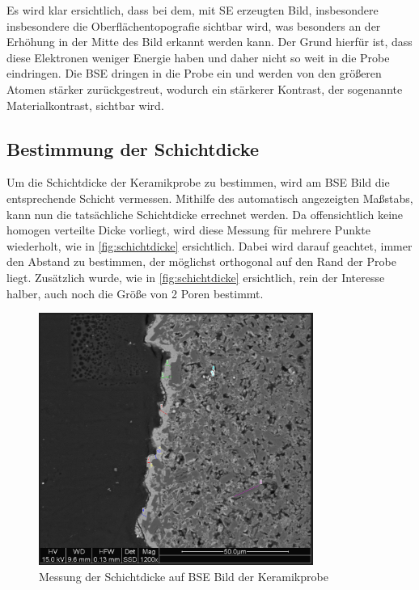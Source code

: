 \documentclass[12pt,english,ngerman]{scrartcl}
\begin{document}
Es wird klar ersichtlich, dass bei dem, mit SE erzeugten Bild, insbesondere insbesondere die Oberflächentopografie sichtbar
wird, was besonders an der Erhöhung in der Mitte des Bild erkannt werden kann. Der Grund hierfür ist, dass diese Elektronen
weniger Energie haben und daher nicht so weit in die Probe eindringen. Die BSE dringen in die Probe ein und werden von den 
größeren Atomen stärker zurückgestreut, wodurch ein stärkerer Kontrast, der sogenannte Materialkontrast, sichtbar wird.


\subsection{Bestimmung der Schichtdicke}

Um die Schichtdicke der Keramikprobe zu bestimmen, wird am BSE Bild die entsprechende Schicht vermessen. Mithilfe des automatisch
angezeigten Maßstabs, kann nun die tatsächliche Schichtdicke errechnet werden. Da offensichtlich keine homogen verteilte
Dicke vorliegt, wird diese Messung für mehrere Punkte wiederholt, wie in \autoref{fig:schichtdicke} ersichtlich. Dabei wird 
darauf geachtet, immer den Abstand zu bestimmen, der möglichst orthogonal auf den Rand der Probe liegt. Zusätzlich wurde,
wie in \autoref{fig:schichtdicke} ersichtlich, rein der Interesse halber, auch noch die Größe von 2 Poren bestimmt.

\begin{figure}[H]
	\begin{center}
		\includegraphics[width =0.8\textwidth]{./figures/schichtdicke.png}
	\end{center}
	\caption{Messung der Schichtdicke auf BSE Bild der Keramikprobe}
    \label{fig:schichtdicke}
\end{figure}
\end{document}

